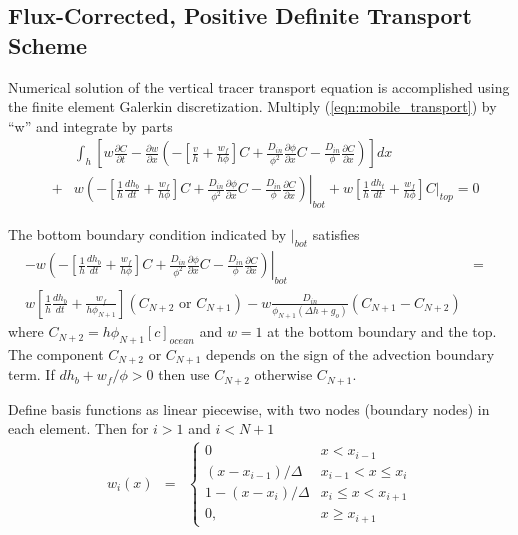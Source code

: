 \subsection{Flux-Corrected, Positive Definite Transport
  Scheme} \label{append:tracer_numerics}
Numerical solution of the vertical tracer transport equation is
accomplished using the  finite element Galerkin discretization.
Multiply (\ref{eqn:mobile_transport}) by ``w'' and
integrate by parts
\begin{eqnarray}
& & \int_{h}\left[ w\frac{\partial C}{\partial t} -   \frac{\partial
    w}{\partial x} \left(-\left[\frac{v}{h} + \frac{w_f}{h\phi}\right]C + \frac{D_{in}}{\phi^2}\frac{\partial
      \phi}{\partial x}C  -  \frac{D_{in}}{\phi}\frac{\partial C}{\partial
      x} \right) \right]dx \nonumber \\
& + &  w\left.\left(
    -\left[\frac{1}{h}\frac{dh_b}{dt}+  \frac{w_f}{h\phi}\right]C + \frac{D_{in}}{\phi^2}\frac{\partial \phi}{\partial
    x}C -\frac{D_{in}}{\phi}\frac{\partial C}{\partial
    x}\right)\right|_{bot} + w\left[\frac{1}{h}\frac{dh_t}{dt} +
\frac{w_f}{h\phi}\right]C|_{top}  =  0 
\end{eqnarray}


The bottom boundary condition indicated by $|_{bot}$ satisfies
\begin{eqnarray}
-w\left.\left(
    -\left[\frac{1}{h}\frac{dh_b}{dt}+  \frac{w_f}{h\phi}\right]C + \frac{D_{in}}{\phi^2}\frac{\partial \phi}{\partial
    x}C -\frac{D_{in}}{\phi}\frac{\partial C}{\partial
    x}\right)\right|_{bot} & = & \nonumber \\
 w\left[\frac{1}{h}\frac{dh_b}{dt} +
\frac{w_f}{h \phi_{N+1}}\right](C_{N+2} \mbox{ or }C_{N+1}) -
w\frac{D_{in}}{\phi_{N+1}(\Delta h+g_o)}\left(C_{N+1} - C_{N+2}\right) & & 
\end{eqnarray}
where $C_{N+2} = h\phi_{N+1}[c]_{ocean}$ and $w = 1$ at the bottom
boundary and the top.  The component $C_{N+2}$ or $C_{N+1}$ depends on
the sign of the advection boundary term.  If $dh_b + w_f/\phi > 0$
then use $C_{N+2}$ otherwise $C_{N+1}$. 

Define basis functions as linear piecewise, with two nodes
(boundary nodes) in each element. Then for  $i > 1$ and $i < N+1$
\begin{eqnarray}
w_i(x) & = & \left\{ \begin{array}{llll}
0 & x < x_{i-1} \\
(x - x_{i-1})/\Delta & x_{i-1}< x \leq x_{i} \\
1 - (x-x_i)/\Delta & x_i \leq x < x_{i+1} \\
0, & x \geq x_{i+1} 
\end{array}
\right.
\end{eqnarray}

